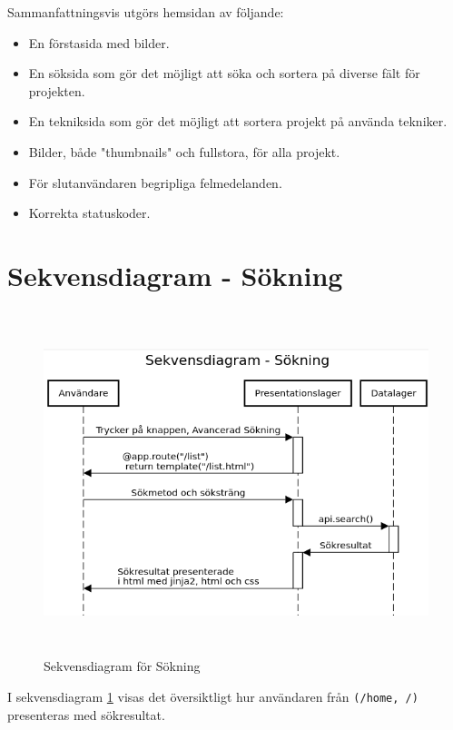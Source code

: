 \documentclass{TDP003mall}
\begin{document}
Sammanfattningsvis utgörs hemsidan av följande:
\begin{itemize}
    \item En förstasida med bilder.
    \item En söksida som gör det möjligt att söka och sortera på diverse fält för projekten.
    \item En tekniksida som gör det möjligt att sortera projekt på använda tekniker.
    \item Bilder, både "thumbnails" och fullstora, för alla projekt.
    \item För slutanvändaren begripliga felmedelanden.
    \item Korrekta statuskoder.
\end{itemize}

\newpage
\section{Sekvensdiagram - Sökning}

\begin{figure}[h]
  \centerline{\includegraphics[width=\textwidth, height=10cm]{../Pictures/Sekvensdiagram.png}}
  \caption{Sekvensdiagram för Sökning \label{fig:2}}
\end{figure}

I sekvensdiagram \ref{fig:2} visas det översiktligt hur användaren från \texttt{(/home, /)} presenteras med sökresultat.
\end{document}
